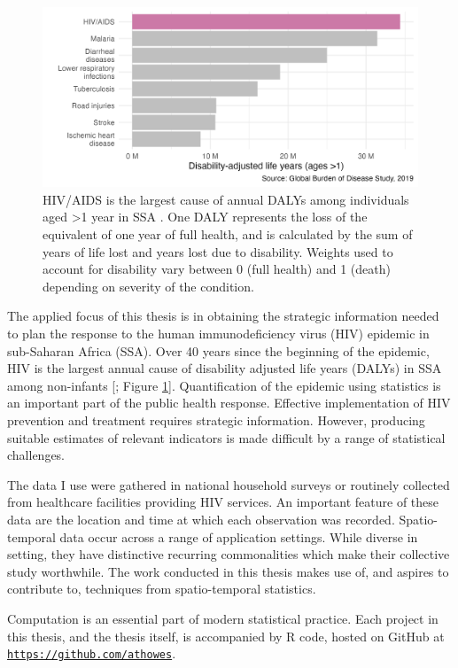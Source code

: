 \documentclass[a4paper, nobind]{templates/ociamthesis}
\begin{document}
\begin{figure}
\includegraphics[width=0.95\linewidth]{figures/introduction/gbd} \caption{HIV/AIDS is the largest cause of annual DALYs among individuals aged \textgreater1 year in SSA \autocite{ihme2019}. One DALY represents the loss of the equivalent of one year of full health, and is calculated by the sum of years of life lost and years lost due to disability. Weights used to account for disability vary between 0 (full health) and 1 (death) depending on severity of the condition.}\label{fig:gbd}
\end{figure}

The applied focus of this thesis is in obtaining the strategic information needed to plan the response to the human immunodeficiency virus (HIV) epidemic in sub-Saharan Africa (SSA).
Over 40 years since the beginning of the epidemic, HIV is the largest annual cause of disability adjusted life years (DALYs) in SSA among non-infants {[}\textcite{ihme2019}; Figure \ref{fig:gbd}{]}.
Quantification of the epidemic using statistics is an important part of the public health response.
Effective implementation of HIV prevention and treatment requires strategic information.
However, producing suitable estimates of relevant indicators is made difficult by a range of statistical challenges.

The data I use were gathered in national household surveys or routinely collected from healthcare facilities providing HIV services.
An important feature of these data are the location and time at which each observation was recorded.
Spatio-temporal data occur across a range of application settings.
While diverse in setting, they have distinctive recurring commonalities which make their collective study worthwhile.
The work conducted in this thesis makes use of, and aspires to contribute to, techniques from spatio-temporal statistics.

Computation is an essential part of modern statistical practice.
Each project in this thesis, and the thesis itself, is accompanied by R \autocite{r} code, hosted on GitHub at \href{https://github.com/athowes}{\texttt{https://github.com/athowes}}.
\end{document}
